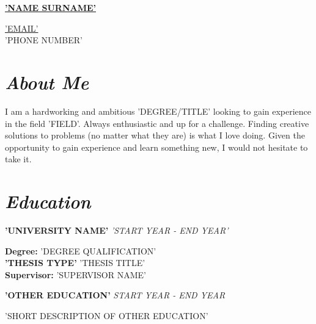 \documentclass{memoir}
\date{'EMAIL ADDRESS'}
\begin{document}
\begin{minipage}{0.5\textwidth}
\textbf{\href{}{\HUGE 'NAME SURNAME'}}
\end{minipage}
\hfill
\begin{minipage}{0.3\textwidth}
\begin{flushright}
{\faEnvelope} \href{mailto:'EMAIL'}{'EMAIL'}\\
{\faPhone} 'PHONE NUMBER'\\
\href{'LINKEDIN LINK'}{\faLinkedin}
\href{'GITHUB LINK'}{\faGithub} 
\end{flushright}
\end{minipage}%

\justifying
\vspace{1.5mm}
\noindent
\begin{minipage}[t]{0.33\textwidth}
\section{\textit{About Me}}
\strut %
\vspace{-3mm}
\begin{adjustwidth}{}{}
I am a hardworking and ambitious 'DEGREE/TITLE' looking to gain experience in the field 'FIELD'.  Always enthusiastic and up for a challenge. Finding creative solutions to problems (no matter what they are) is what I love doing. Given the opportunity to gain experience and learn something new, I would not hesitate to take it.
\end{adjustwidth}
\end{minipage}%
\hfill
\begin{minipage}[t]{0.64\textwidth}
\section{\textit{Education}}
\strut %
\vspace{-3mm}
\begin{adjustwidth}{0.5cm}{}
{\textbf{'UNIVERSITY NAME'}} \hfill {\textit{'START YEAR - END YEAR'}}
\vspace{1mm}
\begin{adjustwidth}{0.5cm}{}
\textbf{Degree:} 'DEGREE QUALIFICATION'\\
\textbf{'THESIS TYPE'} 'THESIS TITLE'\\
\textbf{Supervisor:} 'SUPERVISOR NAME'
\end{adjustwidth}
\vspace{4mm} %
{\textbf{'OTHER EDUCATION'}} \hfill {\textit{START YEAR - END YEAR}}
\begin{adjustwidth}{0.5cm}{}
'SHORT DESCRIPTION OF OTHER EDUCATION'
\end{adjustwidth}
\end{adjustwidth}
\end{minipage}
\end{document}
